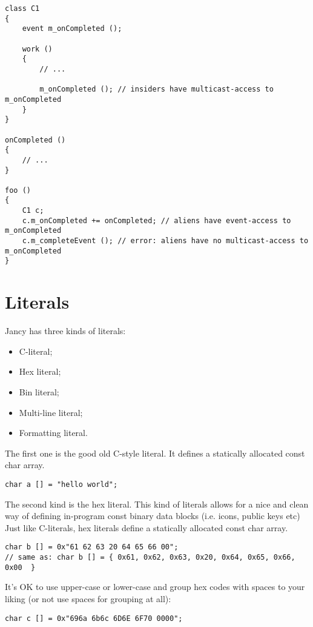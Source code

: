 \documentclass[oneside]{book}
\begin{document}
\begin{lstlisting}
class C1
{
    event m_onCompleted ();

    work ()
    {
        // ...

        m_onCompleted (); // insiders have multicast-access to m_onCompleted
    }
}

onCompleted ()
{
    // ...
}

foo ()
{
    C1 c;
    c.m_onCompleted += onCompleted; // aliens have event-access to m_onCompleted
    c.m_completeEvent (); // error: aliens have no multicast-access to m_onCompleted
}
\end{lstlisting}

\section{Literals}
Jancy has three kinds of literals:

\begin{itemize}
\item C-literal;
\item Hex literal;
\item Bin literal;
\item Multi-line literal;
\item Formatting literal.
\end{itemize}

The first one is the good old C-style literal. It defines a statically allocated const char array.

\begin{lstlisting}
char a [] = "hello world";
\end{lstlisting}

The second kind is the hex literal. This kind of literals allows for a nice and clean way of defining in-program const binary data blocks (i.e. icons, public keys etc) Just like C-literals, hex literals define a statically allocated const char array.

\begin{lstlisting}
char b [] = 0x"61 62 63 20 64 65 66 00";  
// same as: char b [] = { 0x61, 0x62, 0x63, 0x20, 0x64, 0x65, 0x66, 0x00  }
\end{lstlisting}

It's OK to use upper-case or lower-case and group hex codes with spaces to your liking (or not use spaces for grouping at all):

\begin{lstlisting}
char c [] = 0x"696a 6b6c 6D6E 6F70 0000";
\end{lstlisting}
\end{document}
